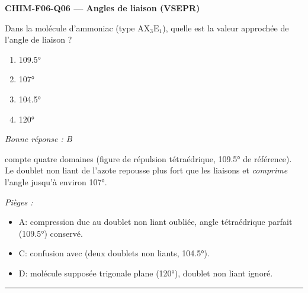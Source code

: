 \documentclass[11pt,a4paper]{article}
\begin{document}
\noindent\textbf{CHIM-F06-Q06 --- Angles de liaison (VSEPR)}\par
Dans la molécule d'ammoniac  (type $\mathrm{AX_3E_1}$), quelle est la valeur approchée de
l'angle de liaison  ?
\begin{enumerate}[label=\Alph*)]
\item \ang{109.5}
\item \ang{107}
\item \ang{104.5}
\item \ang{120}
\end{enumerate}
\textit{Bonne réponse : B}\par
{} compte quatre domaines (figure de répulsion tétraédrique, \ang{109.5} de référence). Le
doublet non liant de l'azote repousse plus fort que les liaisons et \emph{comprime} l'angle
 jusqu'à environ \ang{107}.\par
\textit{Pièges :}
\begin{itemize}
\item A: compression due au doublet non liant oubliée, angle tétraédrique parfait (\ang{109.5}) conservé.
\item C: confusion avec  (deux doublets non liants, \ang{104.5}).
\item D: molécule supposée trigonale plane (\ang{120}), doublet non liant ignoré.
\end{itemize}
\vspace{8pt}\hrule\vspace{8pt}
\end{document}
